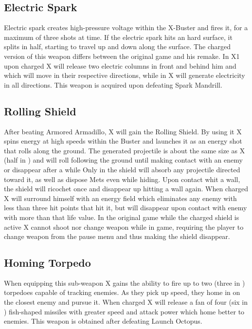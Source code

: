 \subsection{Electric Spark}\label{Electric_spark}
Electric spark creates high-pressure voltage within the X-Buster and fires it, for a maximum of three shots at time. If the electric spark hits an hard surface, it splits in half, starting to travel up and down along the surface. The charged version of this weapon differs between the original game and his remake. In X1 upon charged X will release two electric columns in front and behind him and which will move in their respective directions, while in \mhx X will generate electricity in all directions. This weapon is acquired upon defeating Spark Mandrill.

\subsection{Rolling Shield}\label{Rolling_shield}
After beating Armored Armadillo, X will gain the Rolling Shield. By using it X spins energy at high speeds within the Buster and launches it	as an energy shot that rolls along the ground. The generated projectile is about the same size as X (half in \mhx) and will roll following the ground until making contact with an enemy or disappear after a while Only in \mhx the shield will absorb any projectile directed toward it, as well as dispose Mets even while hiding\cite{wiki:Rolling_shield}. Upon contact whit a wall, the shield will ricochet once and disappear up hitting a wall again. When charged X will surround himself with an energy field which eliminates any enemy with less than three hit points that hit it, but will disappear upon contact with enemy with more than that life value. In the original game while the charged shield is active X cannot shoot nor change weapon while in game, requiring the player to change weapon from the pause menu and thus making the shield disappear.

\subsection{Homing Torpedo}\label{Homing_torpedo}
When equipping this sub-weapon X gains the ability to fire up to two (three in \mhx)\cite{wiki:Homing_torpedo} torpedoes capable of tracking enemies. As they pick up speed, they home in on the closest enemy and pursue it. When charged X will release a fan of four (six in \mhx) fish-shaped missiles with greater speed and attack power which home better to enemies. This weapon is obtained after defeating Launch Octopus.

